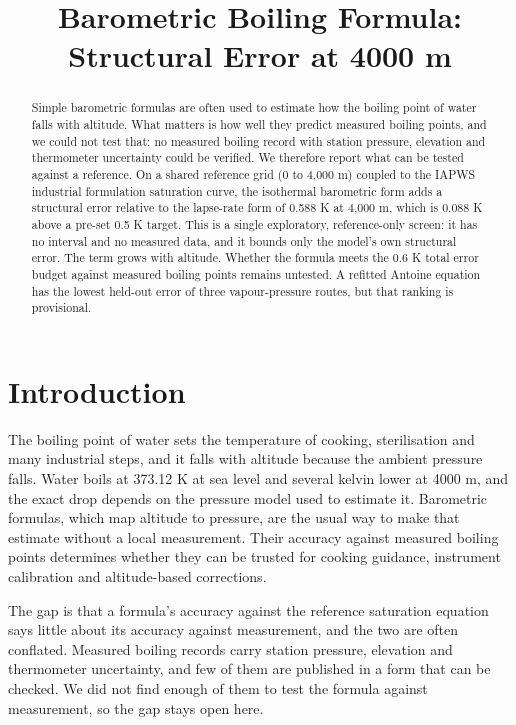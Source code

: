 \documentclass[11pt,letterpaper]{article}
\title{Barometric Boiling Formula: Structural Error at 4000 m}
\author{}
\date{}
\begin{document}
\maketitle

\begin{abstract}
Simple barometric formulas are often used to estimate how the boiling point of water falls with altitude. What matters is how well they predict measured boiling points, and we could not test that: no measured boiling record with station pressure, elevation and thermometer uncertainty could be verified. We therefore report what can be tested against a reference. On a shared reference grid (0 to 4,000 m) coupled to the IAPWS industrial formulation saturation curve, the isothermal barometric form adds a structural error relative to the lapse-rate form of 0.588 K at 4,000 m, which is 0.088 K above a pre-set 0.5 K target. This is a single exploratory, reference-only screen: it has no interval and no measured data, and it bounds only the model's own structural error. The term grows with altitude. Whether the formula meets the 0.6 K total error budget against measured boiling points remains untested. A refitted Antoine equation has the lowest held-out error of three vapour-pressure routes, but that ranking is provisional.
\end{abstract}

\section{Introduction}\label{sec:intro}

The boiling point of water sets the temperature of cooking, sterilisation and many industrial steps, and it falls with altitude because the ambient pressure falls. Water boils at 373.12 K at sea level and several kelvin lower at 4000 m, and the exact drop depends on the pressure model used to estimate it. Barometric formulas, which map altitude to pressure, are the usual way to make that estimate without a local measurement. Their accuracy against measured boiling points determines whether they can be trusted for cooking guidance, instrument calibration and altitude-based corrections.

The gap is that a formula's accuracy against the reference saturation equation says little about its accuracy against measurement, and the two are often conflated. Measured boiling records carry station pressure, elevation and thermometer uncertainty, and few of them are published in a form that can be checked. We did not find enough of them to test the formula against measurement, so the gap stays open here.
\end{document}
